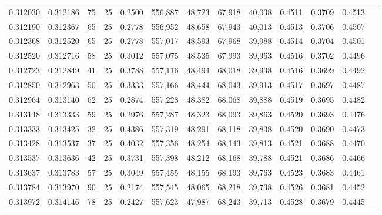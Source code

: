 \begin{tabular}{rrrrrrrrrrrrr}
0.312030 & 0.312186 &    75 &  25 &                                     0.2500 & 556,887 &  48,723 &  67,918 &  40,038 & 0.4511 & 0.3709 & 0.4513 \\
0.312190 & 0.312367 &    65 &  25 &                                     0.2778 & 556,952 &  48,658 &  67,943 &  40,013 & 0.4513 & 0.3706 & 0.4507 \\
0.312368 & 0.312520 &    65 &  25 &                                     0.2778 & 557,017 &  48,593 &  67,968 &  39,988 & 0.4514 & 0.3704 & 0.4501 \\
0.312520 & 0.312716 &    58 &  25 &                                     0.3012 & 557,075 &  48,535 &  67,993 &  39,963 & 0.4516 & 0.3702 & 0.4496 \\
0.312723 & 0.312849 &    41 &  25 &                                     0.3788 & 557,116 &  48,494 &  68,018 &  39,938 & 0.4516 & 0.3699 & 0.4492 \\
0.312850 & 0.312963 &    50 &  25 &                                     0.3333 & 557,166 &  48,444 &  68,043 &  39,913 & 0.4517 & 0.3697 & 0.4487 \\
0.312964 & 0.313140 &    62 &  25 &                                     0.2874 & 557,228 &  48,382 &  68,068 &  39,888 & 0.4519 & 0.3695 & 0.4482 \\
0.313148 & 0.313333 &    59 &  25 &                                     0.2976 & 557,287 &  48,323 &  68,093 &  39,863 & 0.4520 & 0.3693 & 0.4476 \\
0.313333 & 0.313425 &    32 &  25 &                                     0.4386 & 557,319 &  48,291 &  68,118 &  39,838 & 0.4520 & 0.3690 & 0.4473 \\
0.313428 & 0.313537 &    37 &  25 &                                     0.4032 & 557,356 &  48,254 &  68,143 &  39,813 & 0.4521 & 0.3688 & 0.4470 \\
0.313537 & 0.313636 &    42 &  25 &                                     0.3731 & 557,398 &  48,212 &  68,168 &  39,788 & 0.4521 & 0.3686 & 0.4466 \\
0.313637 & 0.313783 &    57 &  25 &                                     0.3049 & 557,455 &  48,155 &  68,193 &  39,763 & 0.4523 & 0.3683 & 0.4461 \\
0.313784 & 0.313970 &    90 &  25 &                                     0.2174 & 557,545 &  48,065 &  68,218 &  39,738 & 0.4526 & 0.3681 & 0.4452 \\
0.313972 & 0.314146 &    78 &  25 &                                     0.2427 & 557,623 &  47,987 &  68,243 &  39,713 & 0.4528 & 0.3679 & 0.4445 \\

\end{tabular}
